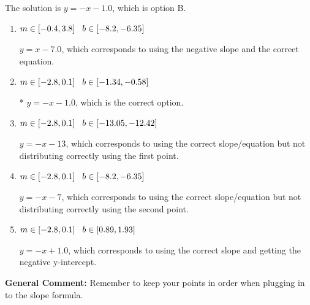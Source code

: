 \documentclass{extbook}[14pt]
\begin{document}
\begin{enumerate}
{The solution is \( y = -x -1.0 \), which is option B.\begin{enumerate}[label=\Alph*.]
\item \( m \in [-0.4, 3.8] \hspace*{3mm} b \in [-8.2, -6.35] \)

 $y = x -7.0$, which corresponds to using the negative slope and the correct equation.
\item \( m \in [-2.8, 0.1] \hspace*{3mm} b \in [-1.34, -0.58] \)

* $y = -x -1.0$, which is the correct option.
\item \( m \in [-2.8, 0.1] \hspace*{3mm} b \in [-13.05, -12.42] \)

 $y = -x -13$, which corresponds to using the correct slope/equation but not distributing correctly using the first point.
\item \( m \in [-2.8, 0.1] \hspace*{3mm} b \in [-8.2, -6.35] \)

 $y = -x -7$, which corresponds to using the correct slope/equation but not distributing correctly using the second point.
\item \( m \in [-2.8, 0.1] \hspace*{3mm} b \in [0.89, 1.93] \)

 $y = -x + 1.0$, which corresponds to using the correct slope and getting the negative y-intercept.
\end{enumerate}

\textbf{General Comment:} Remember to keep your points in order when plugging in to the slope formula.
}
\end{enumerate}
\end{document}
